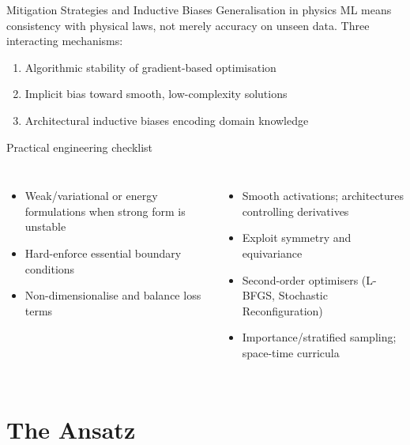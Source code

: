\documentclass[aspectratio=169,10pt]{beamer}
\begin{document}
\begin{frame}{Mitigation Strategies and Inductive Biases}
  Generalisation in physics ML means \alert{consistency with physical laws},
  not merely accuracy on unseen data. Three interacting mechanisms:
  \begin{enumerate}
    \item Algorithmic stability of gradient-based optimisation
    \item Implicit bias toward smooth, low-complexity solutions
    \item Architectural inductive biases encoding domain knowledge
  \end{enumerate}

  \vspace{0.3cm}
  \begin{block}{Practical engineering checklist}
    \small
    \begin{columns}[T]
        \begin{itemize}
          \item Weak/variational or energy formulations when strong form
                is unstable
          \item Hard-enforce essential boundary conditions
          \item Non-dimensionalise and balance loss terms
        \end{itemize}
        \begin{itemize}
          \item Smooth activations; architectures controlling derivatives
          \item Exploit symmetry and equivariance
          \item Second-order optimisers (L-BFGS, Stochastic Reconfiguration)
          \item Importance/stratified sampling; space-time curricula
        \end{itemize}
    \end{columns}
  \end{block}
\end{frame}

\section{The Ansatz}
\end{document}
